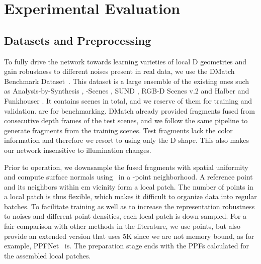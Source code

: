 \section{Experimental Evaluation}
\subsection{Datasets and Preprocessing} To fully drive the network towards learning varieties of local D geometries and gain robustness to different noises present in real data, we use the DMatch Benchmark Dataset~\cite{zeng20163dmatch}. This dataset is a large ensemble of the existing ones such as Analysis-by-Synthesis \cite{valentin2016learning}, -Scenes \cite{shotton2013scene}, SUND \cite{xiao2013sun3d}, RGB-D Scenes v.2 \cite{lai2014unsupervised} and Halber and Funkhouser \cite{halber2016structured}. It contains  scenes in total, and we reserve  of them for training and validation.  are for benchmarking. DMatch already provided fragments fused from  consecutive depth frames of the  test scenes, and we follow the same pipeline to generate fragments from the training scenes. Test fragments lack the color information and therefore we resort to using only the D shape. This also makes our network insensitive to illumination changes.

Prior to operation, we downsample the fused fragments with spatial uniformity~\cite{birdal2017sampling} and compute surface normals using~\cite{Hoppe1992} in a -point neighborhood. A reference point and its neighbors within  cm vicinity form a local patch. The number of points in a local patch is thus flexible, which makes it difficult to organize data into regular batches. To facilitate training as well as to increase the representation robustness to noises and different point densities, each local patch is down-sampled. For a fair comparison with other methods in the literature, we use  points, but also provide an extended version that uses 5K since we are not memory bound, as for example, PPFNet~\cite{ppfnet} is. The preparation stage ends with the PPFs calculated for the assembled local patches.


